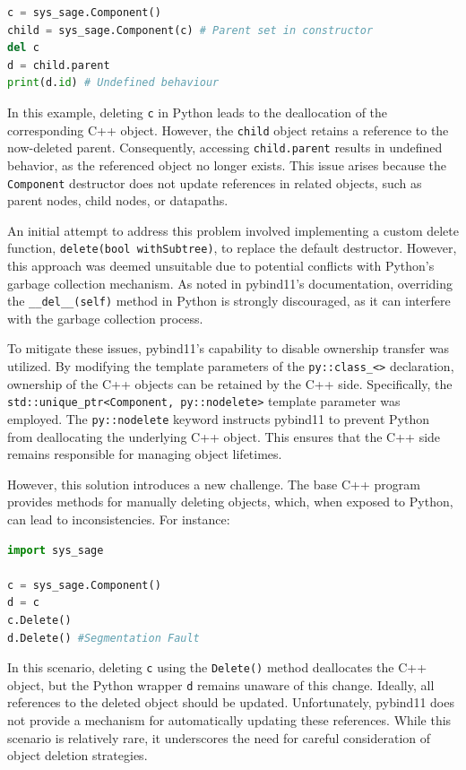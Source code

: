   \begin{lstlisting}[language=Python, xleftmargin=4em, frame = single]
c = sys_sage.Component()
child = sys_sage.Component(c) # Parent set in constructor
del c
d = child.parent
print(d.id) # Undefined behaviour
  \end{lstlisting}

In this example, deleting \verb|c| in Python leads to the deallocation of the corresponding C++ object. However, the \verb|child| object retains a reference to the now-deleted parent. Consequently, accessing \verb|child.parent| results in undefined behavior, as the referenced object no longer exists. This issue arises because the \verb|Component| destructor does not update references in related objects, such as parent nodes, child nodes, or datapaths.

An initial attempt to address this problem involved implementing a custom delete function, \verb|delete(bool withSubtree)|, to replace the default destructor. However, this approach was deemed unsuitable due to potential conflicts with Python's garbage collection mechanism. As noted in pybind11's documentation, overriding the \verb|__del__(self)| method in Python is strongly discouraged, as it can interfere with the garbage collection process. \cite{python-gc}\cite{pybind11-issue-327}

To mitigate these issues, pybind11's capability to disable ownership transfer was utilized. By modifying the template parameters of the \verb|py::class_<>| declaration, ownership of the C++ objects can be retained by the C++ side. Specifically, the \verb|std::unique_ptr<Component, py::nodelete>| template parameter was employed. The \verb|py::nodelete| keyword instructs pybind11 to prevent Python from deallocating the underlying C++ object. This ensures that the C++ side remains responsible for managing object lifetimes. \cite[see Advanced Topics/Clasees]{pybind11-docu}

However, this solution introduces a new challenge. The base C++ program provides methods for manually deleting objects, which, when exposed to Python, can lead to inconsistencies. For instance:
\newpage
  \begin{lstlisting}[language=Python, xleftmargin=4em, frame = single]
import sys_sage

c = sys_sage.Component()
d = c
c.Delete()
d.Delete() #Segmentation Fault
  \end{lstlisting}
  

In this scenario, deleting \verb|c| using the \verb|Delete()| method deallocates the C++ object, but the Python wrapper \verb|d| remains unaware of this change. Ideally, all references to the deleted object should be updated. Unfortunately, pybind11 does not provide a mechanism for automatically updating these references. While this scenario is relatively rare, it underscores the need for careful consideration of object deletion strategies.

